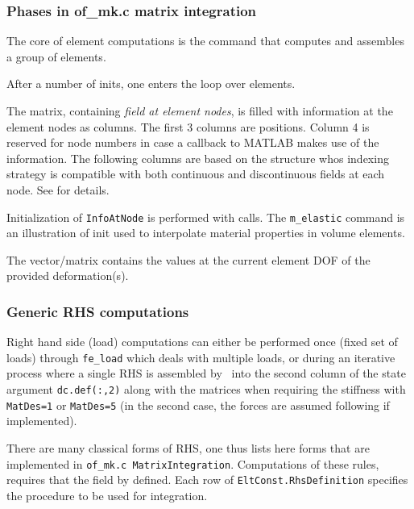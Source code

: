 \subsubsection{Phases in of\_mk.c matrix integration} 

The core of element computations is the  command that computes and assembles a group of elements.

After a number of inits, one enters the loop over elements. 

The  matrix, containing {\em field at element nodes}, is filled with information at the element nodes as columns. The first 3 columns are positions. Column 4 is reserved for node numbers in case a callback to MATLAB makes use of the information. The following columns are based on the  structure whos indexing strategy is compatible with both continuous and discontinuous fields at each node. See  for details.

Initialization of {\tt InfoAtNode} is performed with  calls. The {\tt m\_elastic}  command is an illustration of init used to interpolate material properties in volume elements.

The  vector/matrix contains the values at the current element DOF of the provided deformation(s).

\subsubsection{Generic RHS computations\label{rhs_og}} 

Right hand side (load) computations can either be performed once (fixed set of loads) through {\tt fe\_load} which deals with multiple loads, or during an iterative process where a single RHS is assembled by \femknl\ into the second column of the state argument  {\tt dc.def(:,2)} along with the matrices when requiring the stiffness with {\tt MatDes=1} or {\tt MatDes=5} (in the second case, the forces are assumed following if implemented).


 There are many classical forms of RHS, one thus lists here forms that are implemented in {\tt of\_mk.c MatrixIntegration}. Computations of these rules, requires that the  field by defined. Each row of {\tt EltConst.RhsDefinition} specifies the procedure to be used for integration. 

